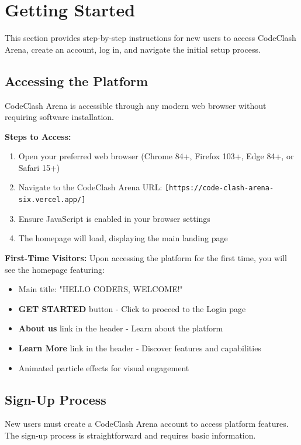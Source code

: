 \documentclass[12pt,a4paper]{article}
\begin{document}
\section{Getting Started}

This section provides step-by-step instructions for new users to access CodeClash Arena, create an account, log in, and navigate the initial setup process.

\subsection{Accessing the Platform}

CodeClash Arena is accessible through any modern web browser without requiring software installation.

\textbf{Steps to Access:}
\begin{enumerate}
\item Open your preferred web browser (Chrome 84+, Firefox 103+, Edge 84+, or Safari 15+)
\item Navigate to the CodeClash Arena URL: \texttt{[https://code-clash-arena-six.vercel.app/]}
\item Ensure JavaScript is enabled in your browser settings
\item The homepage will load, displaying the main landing page
\end{enumerate}

\textbf{First-Time Visitors:} Upon accessing the platform for the first time, you will see the homepage featuring:
\begin{itemize}[leftmargin=*]
\item Main title: "HELLO CODERS, WELCOME!"
\item \textbf{GET STARTED} button - Click to proceed to the Login page
\item \textbf{About us} link in the header - Learn about the platform
\item \textbf{Learn More} link in the header - Discover features and capabilities
\item Animated particle effects for visual engagement
\end{itemize}

\subsection{Sign-Up Process}

New users must create a CodeClash Arena account to access platform features. The sign-up process is straightforward and requires basic information.
\end{document}
